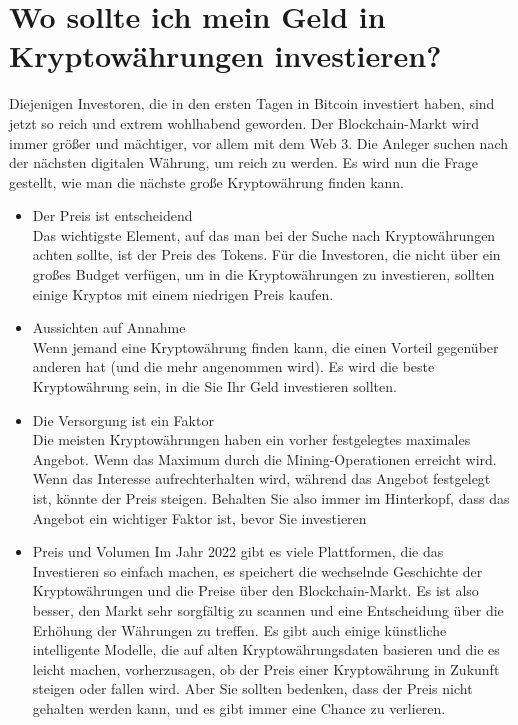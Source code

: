 \documentclass[ngerman]{scrreprt}
\begin{document}
\section{Wo sollte ich mein Geld in Kryptowährungen investieren?}
Diejenigen Investoren, die in den ersten Tagen in Bitcoin investiert haben, sind jetzt so reich und extrem wohlhabend geworden.
Der Blockchain-Markt wird immer größer und mächtiger, vor allem mit dem Web 3. Die Anleger suchen nach der nächsten digitalen Währung, um reich zu werden. Es wird nun die Frage gestellt, wie man die nächste große Kryptowährung finden kann.
\begin{itemize}
	\item Der Preis ist entscheidend\\
	Das wichtigste Element, auf das man bei der Suche nach Kryptowährungen achten sollte, ist der Preis des Tokens. Für die Investoren, die nicht über ein großes Budget verfügen, um in die Kryptowährungen zu investieren, sollten einige Kryptos mit einem niedrigen Preis kaufen.
	\item Aussichten auf Annahme\\
	Wenn jemand eine Kryptowährung finden kann, die einen Vorteil gegenüber anderen hat (und die mehr angenommen wird). Es wird die beste Kryptowährung sein, in die Sie Ihr Geld investieren sollten.
	\item Die Versorgung ist ein Faktor\\
	Die meisten Kryptowährungen haben ein vorher festgelegtes maximales Angebot. Wenn das Maximum durch die Mining-Operationen erreicht wird. Wenn das Interesse aufrechterhalten wird, während das Angebot festgelegt ist, könnte der Preis steigen. Behalten Sie also immer im Hinterkopf, dass das Angebot ein wichtiger Faktor ist, bevor Sie investieren
	\item Preis und Volumen
	Im Jahr 2022 gibt es viele Plattformen, die das Investieren so einfach machen, es speichert die wechselnde Geschichte der Kryptowährungen und die Preise über den Blockchain-Markt. Es ist also besser, den Markt sehr sorgfältig zu scannen und eine Entscheidung über die Erhöhung der Währungen zu treffen. Es gibt auch einige künstliche intelligente Modelle, die auf alten Kryptowährungsdaten basieren und die es leicht machen, vorherzusagen, ob der Preis einer Kryptowährung in Zukunft steigen oder fallen wird.
	Aber Sie sollten bedenken, dass der Preis nicht gehalten werden kann, und es gibt immer eine Chance zu verlieren. 
\end{itemize}
\end{document}

